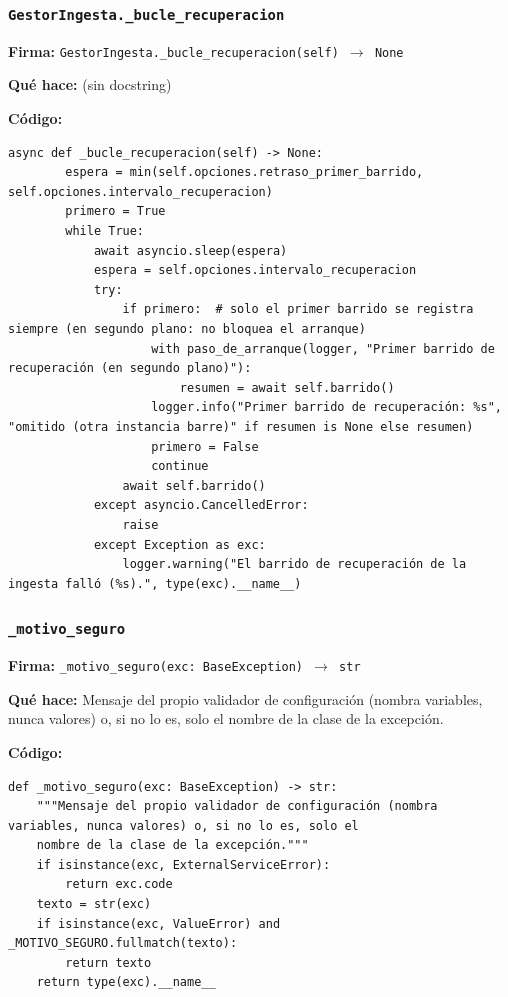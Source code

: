 \documentclass[11pt,a4paper]{article}
\begin{document}
\subsubsection*{\texttt{GestorIngesta.\_bucle\_recuperacion}}
\textbf{Firma:} \texttt{GestorIngesta.\_bucle\_recuperacion(self) $\rightarrow$ None}

\textbf{Qué hace:} (sin docstring)

\textbf{Código:}
\begin{lstlisting}
async def _bucle_recuperacion(self) -> None:
        espera = min(self.opciones.retraso_primer_barrido, self.opciones.intervalo_recuperacion)
        primero = True
        while True:
            await asyncio.sleep(espera)
            espera = self.opciones.intervalo_recuperacion
            try:
                if primero:  # solo el primer barrido se registra siempre (en segundo plano: no bloquea el arranque)
                    with paso_de_arranque(logger, "Primer barrido de recuperación (en segundo plano)"):
                        resumen = await self.barrido()
                    logger.info("Primer barrido de recuperación: %s", "omitido (otra instancia barre)" if resumen is None else resumen)
                    primero = False
                    continue
                await self.barrido()
            except asyncio.CancelledError:
                raise
            except Exception as exc:
                logger.warning("El barrido de recuperación de la ingesta falló (%s).", type(exc).__name__)
\end{lstlisting}

\subsubsection*{\texttt{\_motivo\_seguro}}
\textbf{Firma:} \texttt{\_motivo\_seguro(exc: BaseException) $\rightarrow$ str}

\textbf{Qué hace:} Mensaje del propio validador de configuración (nombra variables, nunca valores) o, si no lo es, solo el
nombre de la clase de la excepción.

\textbf{Código:}
\begin{lstlisting}
def _motivo_seguro(exc: BaseException) -> str:
    """Mensaje del propio validador de configuración (nombra variables, nunca valores) o, si no lo es, solo el
    nombre de la clase de la excepción."""
    if isinstance(exc, ExternalServiceError):
        return exc.code
    texto = str(exc)
    if isinstance(exc, ValueError) and _MOTIVO_SEGURO.fullmatch(texto):
        return texto
    return type(exc).__name__
\end{lstlisting}
\end{document}
